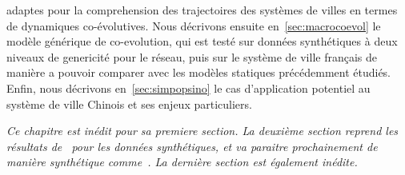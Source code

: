 adaptes pour la comprehension des trajectoires des systèmes de villes en termes de dynamiques co-évolutives. Nous décrivons ensuite en~\ref{sec:macrocoevol} le modèle générique de co-evolution, qui est testé sur données synthétiques à deux niveaux de genericité pour le réseau, puis sur le système de ville français de manière a pouvoir comparer avec les modèles statiques précédemment étudiés. Enfin, nous décrivons en~\ref{sec:simpopsino} le cas d'application potentiel au système de ville Chinois et ses enjeux particuliers.




\stars


\textit{Ce chapitre est inédit pour sa premiere section. La deuxième section reprend les résultats de~\cite{} %
pour les données synthétiques, et va paraitre prochainement de manière synthétique comme~\cite{}. %
La dernière section est également inédite.
}















